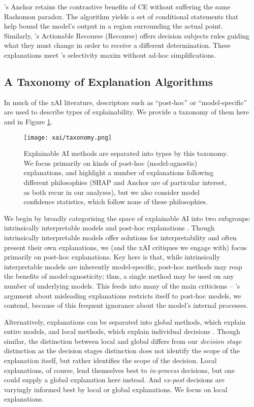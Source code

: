 \textcite{Ribeiro-et-al-anchors}'s Anchor retains the contrastive benefits of CE without suffering the same Rashomon paradox. The algorithm yields a set of conditional statements that help bound the model's output in a region surrounding the actual point. Similarly, \textcite{Ustun-et-al}'s Actionable Recourse (Recourse) offers decision subjects rules guiding what they must change in order to receive a different determination. These explanations meet \textcite{Miller}'s selectivity maxim without ad-hoc simplifications.

\subsection{A Taxonomy of Explanation Algorithms}
In much of the xAI literature, descriptors such as ``post-hoc'' or ``model-specific'' are used to describe types of explainability. We provide a taxonomy of them here and in Figure \ref{fig:taxonomy}.

\begin{figure}[htbp]
    \centering
    \texttt{[image: xai/taxonomy.png]}
    \caption{Explainable AI methods are separated into types by this taxonomy. We focus primarily on kinds of post-hoc (model-agnostic) explanations, and highlight a number of explanations following different philosophies (SHAP and Anchor are of particular interest, as both recur in our analyses), but we also consider model confidence statistics, which follow none of these philosophies.}
    \label{fig:taxonomy}
\end{figure}

We begin by broadly categorising the space of explainable AI into two subgroups: intrinsically interpretable models and post-hoc explanations \cite{Molnar}. Though intrinsically interpretable models offer solutions for interpretability and often present their own explanations, we (and the xAI critiques we engage with) focus primarily on post-hoc explanations. Key here is that, while intrinsically interpretable models are inherently model-specific, post-hoc methods may reap the benefits of model-agnosticity; thus, a single method may be used on any number of underlying models. This feeds into many of the main criticisms – \textcite{Lipton}'s argument about misleading explanations restricts itself to post-hoc models, we contend, because of this frequent ignorance about the model's internal processes.

Alternatively, explanations can be separated into global methods, which explain entire models, and local methods, which explain individual decisions \cite{Molnar}. Though similar, the distinction between local and global differs from our \emph{decision stage} distinction as the decision stages distinction does not identify the scope of the explanation itself, but rather identifies the scope of the decision. Local explanations, of course, lend themselves best to \emph{in-process} decisions, but one could supply a global explanation here instead. And \emph{ex-post} decisions are varyingly informed best by local or global explanations. We focus on local explanations.

